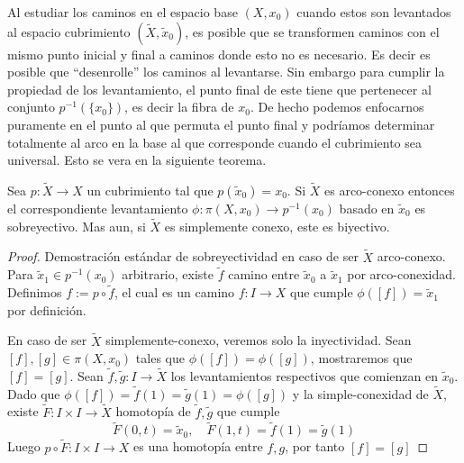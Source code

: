 Al estudiar los caminos en el espacio base \(\left(X, x_0 \right)\)
cuando estos son levantados al espacio cubrimiento \((\tilde X ,
\tilde x _0 )\), es posible que se transformen caminos con el mismo
punto inicial y final a caminos donde esto no es necesario. Es decir es
posible que ``desenrolle'' los caminos al levantarse. Sin embargo para
cumplir la propiedad de los levantamiento, el punto final de este tiene
que pertenecer al conjunto \(p^{-1} \left( \{x_0\} \right)\), es decir
la fibra de \(x_0\). De hecho podemos enfocarnos puramente en el punto
al que permuta el punto final y podríamos determinar totalmente al arco
en la base al que corresponde cuando el cubrimiento sea universal. Esto
se vera en la siguiente teorema.
\begin{teorema} \label{thm:phi-bijec}
  Sea \(p : \tilde X \to X\) un cubrimiento tal que \(p (\tilde x _0) =
  x_0\). Si \(\tilde X\) es arco-conexo entonces el correspondiente
  levantamiento \(\phi : \pi (X, x _0) \to p^{-1} (x_0)\) basado en
  \(\tilde x_0\) es sobreyectivo. Mas aun, si \(\tilde X\) es
  simplemente conexo, este es biyectivo.
\end{teorema}
\begin{proof}
  Demostración estándar de sobreyectividad en caso de ser \(\tilde X\)
  arco-conexo. Para \(\tilde x _1 \in p^{-1} (x_0)\) arbitrario, existe
  \(\tilde f\) camino entre \(\tilde x _0 \) a \(\tilde x _1\) por
  arco-conexidad. Definimos \(f := p \circ \tilde f\), el cual es un
  camino \(f : I \to X\) que cumple \(\phi ([f]) = \tilde x _1\) por
  definición.

  En caso de ser \(\tilde X\) simplemente-conexo, veremos solo la
  inyectividad. Sean \([f],[g] \in \pi (X, x_0)\) tales que \(\phi([f])
  = \phi([g])\), mostraremos que \([f] = [g]\). Sean \(\tilde f, \tilde
  g : I \to \tilde X\) los levantamientos respectivos que comienzan en
  \(\tilde x _0\). Dado que \(\phi([f]) = \tilde f (1) = \tilde g (1) =
  \phi([g])\) y la simple-conexidad de \(\tilde X\), existe \(\tilde F :
  I \times I \to \tilde X\) homotopía de \(\tilde f, \tilde g\) que
  cumple
  \[ \tilde F (0, t) = \tilde x_0, \quad \tilde F (1 , t) = \tilde f
    (1) = \tilde g (1)
  \]
  Luego \(p \circ \tilde F : I \times I \to X \) es una homotopía entre
  \(f, g\), por tanto \([f] = [g]\)
\end{proof}
